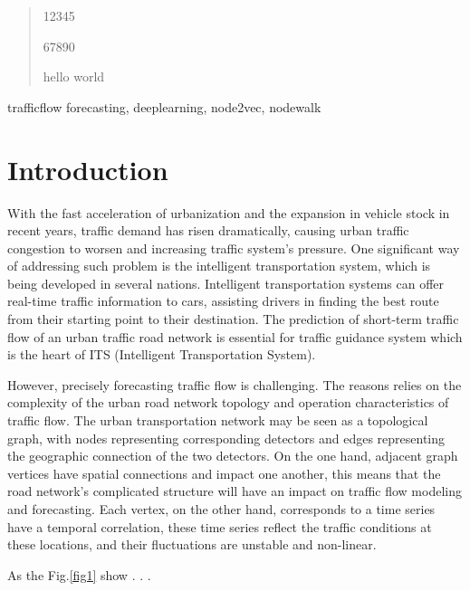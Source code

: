 \documentclass[conference]{IEEEtran}
\begin{document}
\begin{abstract}
\par
12345
\par
67890
\par
hello world
\end{abstract}

\begin{IEEEkeywords}
trafficflow forecasting, deeplearning, node2vec, nodewalk
\end{IEEEkeywords}

\section{Introduction}

With the fast acceleration of urbanization and the expansion in vehicle stock in recent years, traffic demand has risen dramatically, causing urban traffic congestion to worsen and increasing traffic system's pressure. One significant way of addressing such problem is the intelligent transportation system, which is being developed in several nations. Intelligent transportation systems can offer real-time traffic information to cars, assisting drivers in finding the best route from their starting point to their destination. The prediction of short-term traffic flow of an urban traffic road network is essential for traffic guidance system which is the heart of ITS (Intelligent Transportation System).
\par However, precisely forecasting traffic flow is challenging. The reasons relies on the complexity of the urban road network topology and operation characteristics of traffic flow. The urban transportation network may be seen as a topological graph, with nodes representing corresponding detectors and edges representing the geographic connection of the two detectors.  
On the one hand, adjacent graph vertices have spatial connections and impact one another, this means that the road network's complicated structure will have an impact on traffic flow modeling and forecasting. Each vertex, on the other hand, corresponds to a time series have a temporal correlation, these time series reflect the traffic conditions at these locations, and their fluctuations are unstable and non-linear.
\par
As the Fig.\ref{fig1} show . . .
\end{document}
